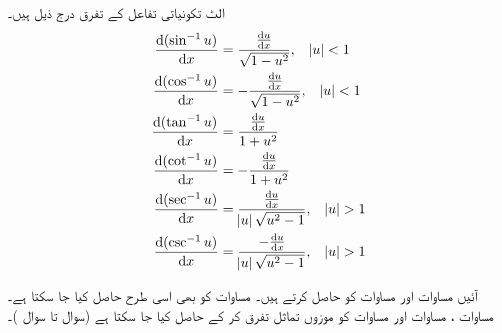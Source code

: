 الٹ تکونیاتی تفاعل کے تفرق درج ذیل ہیں۔
\begin{align}
\frac{\dif\, (\sin^{-1}u)}{\dif x}&=\frac{\frac{\dif u}{\dif x}}{\sqrt{1-u^2}},\quad \abs{u}<1\label{مساوات_ماورائی_الٹ_تکونیاتی_تفرق_الف}\\
\frac{\dif\, (\cos^{-1}u)}{\dif x}&=-\frac{\frac{\dif u}{\dif x}}{\sqrt{1-u^2}},\quad \abs{u}<1\label{مساوات_ماورائی_الٹ_تکونیاتی_تفرق_ب}\\
\frac{\dif\,(\tan^{-1}u)}{\dif x}&=\frac{\frac{\dif u}{\dif x}}{1+u^2}\label{مساوات_ماورائی_الٹ_تکونیاتی_تفرق_پ}\\
\frac{\dif\, (\cot^{-1}u)}{\dif x}&=-\frac{\frac{\dif u}{\dif x}}{1+u^2}\label{مساوات_ماورائی_الٹ_تکونیاتی_تفرق_ت}\\
\frac{\dif\, (\sec^{-1}u)}{\dif x}&=\frac{\frac{\dif u}{\dif x}}{\abs{u}\sqrt{u^2-1}},\quad \abs{u}>1\label{مساوات_ماورائی_الٹ_تکونیاتی_تفرق_ٹ}\\
\frac{\dif\, (\csc^{-1}u)}{\dif x}&=\frac{-\frac{\dif u}{\dif x}}{\abs{u}\sqrt{u^2-1}},\quad \abs{u}>1\label{مساوات_ماورائی_الٹ_تکونیاتی_تفرق_ث}
\end{align}

آئیں مساوات  اور مساوات  کو حاصل کرتے ہیں۔ مساوات  کو بھی اسی طرح حاصل کیا جا سکتا ہے۔ مساوات ، مساوات  اور مساوات  کو موزوں تماثل تفرق کر کے حاصل کیا جا سکتا ہے (سوال  تا سوال )۔

